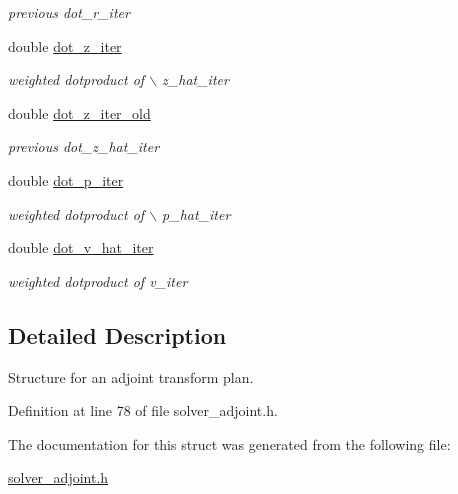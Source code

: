 \begin{CompactItemize}
\begin{CompactList}\small\item\em previous dot\_\-r\_\-iter \item\end{CompactList}\item 
\hypertarget{structimri__inh__2d1d__adjoint__plan_o14}{
double \hyperlink{structimri__inh__2d1d__adjoint__plan_o14}{dot\_\-z\_\-iter}}
\label{structimri__inh__2d1d__adjoint__plan_o14}

\begin{CompactList}\small\item\em weighted dotproduct of $\backslash$ z\_\-hat\_\-iter \item\end{CompactList}\item 
\hypertarget{structimri__inh__2d1d__adjoint__plan_o15}{
double \hyperlink{structimri__inh__2d1d__adjoint__plan_o15}{dot\_\-z\_\-iter\_\-old}}
\label{structimri__inh__2d1d__adjoint__plan_o15}

\begin{CompactList}\small\item\em previous dot\_\-z\_\-hat\_\-iter \item\end{CompactList}\item 
\hypertarget{structimri__inh__2d1d__adjoint__plan_o16}{
double \hyperlink{structimri__inh__2d1d__adjoint__plan_o16}{dot\_\-p\_\-iter}}
\label{structimri__inh__2d1d__adjoint__plan_o16}

\begin{CompactList}\small\item\em weighted dotproduct of $\backslash$ p\_\-hat\_\-iter \item\end{CompactList}\item 
\hypertarget{structimri__inh__2d1d__adjoint__plan_o17}{
double \hyperlink{structimri__inh__2d1d__adjoint__plan_o17}{dot\_\-v\_\-hat\_\-iter}}
\label{structimri__inh__2d1d__adjoint__plan_o17}

\begin{CompactList}\small\item\em weighted dotproduct of v\_\-iter \item\end{CompactList}\end{CompactItemize}


\subsection{Detailed Description}
Structure for an adjoint transform plan. 



Definition at line 78 of file solver\_\-adjoint.h.

The documentation for this struct was generated from the following file:\begin{CompactItemize}
\item 
\hyperlink{solver__adjoint_8h}{solver\_\-adjoint.h}\end{CompactItemize}
